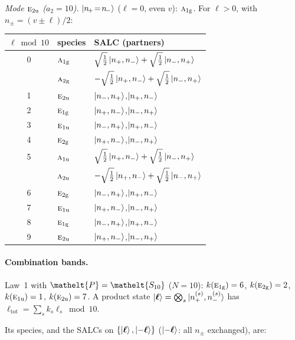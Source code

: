 \documentclass[11pt]{article}
\newcommand{\eltfont}[1]{{\let\sigma\eltsigma\mathelt{#1}}}
\newcommand{\irr}[1]{\text{\normalfont\scshape #1}}
\newcommand{\elt}[1]{\eltfont{#1}}
\newcommand{\ptag}[1]{\mathrm{#1}}
\newcommand{\pel}{\elt{P}}             %
\begin{document}
\emph{Mode $\irr{e}_{2\ptag{u}}$ ($a_2=10$).} $\ket{n_{\!+}\!=\!n_{\!-}}$ ($\ell=0$, even $v$): $\irr{a}_{1\ptag{g}}$. For $\ell>0$, with $n_\pm=(v\pm\ell)/2$:
\begin{longtable}{c l l}\hline $\ell\bmod 10$ & species & SALC (partners)\\ \hline\endhead
0 & $\irr{a}_{1\ptag{g}}$ & $\sqrt{\tfrac{1}{2}}\ket{n_+,n_-}+\sqrt{\tfrac{1}{2}}\ket{n_-,n_+}$\\
 & $\irr{a}_{2\ptag{g}}$ & $-\sqrt{\tfrac{1}{2}}\ket{n_+,n_-}+\sqrt{\tfrac{1}{2}}\ket{n_-,n_+}$\\
1 & $\irr{e}_{2\ptag{u}}$ & $\ket{n_-,n_+}$,\quad $\ket{n_+,n_-}$\\
2 & $\irr{e}_{1\ptag{g}}$ & $\ket{n_+,n_-}$,\quad $\ket{n_-,n_+}$\\
3 & $\irr{e}_{1\ptag{u}}$ & $\ket{n_-,n_+}$,\quad $\ket{n_+,n_-}$\\
4 & $\irr{e}_{2\ptag{g}}$ & $\ket{n_+,n_-}$,\quad $\ket{n_-,n_+}$\\
5 & $\irr{a}_{1\ptag{u}}$ & $\sqrt{\tfrac{1}{2}}\ket{n_+,n_-}+\sqrt{\tfrac{1}{2}}\ket{n_-,n_+}$\\
 & $\irr{a}_{2\ptag{u}}$ & $-\sqrt{\tfrac{1}{2}}\ket{n_+,n_-}+\sqrt{\tfrac{1}{2}}\ket{n_-,n_+}$\\
6 & $\irr{e}_{2\ptag{g}}$ & $\ket{n_-,n_+}$,\quad $\ket{n_+,n_-}$\\
7 & $\irr{e}_{1\ptag{u}}$ & $\ket{n_+,n_-}$,\quad $\ket{n_-,n_+}$\\
8 & $\irr{e}_{1\ptag{g}}$ & $\ket{n_-,n_+}$,\quad $\ket{n_+,n_-}$\\
9 & $\irr{e}_{2\ptag{u}}$ & $\ket{n_+,n_-}$,\quad $\ket{n_-,n_+}$\\
\hline\end{longtable}

\paragraph{Combination bands.}

Law~1 with $\pel=\elt{S_{10}}$ ($N=10$): $k(\irr{e}_{1\ptag{g}})=6$, $k(\irr{e}_{2\ptag{g}})=2$, $k(\irr{e}_{1\ptag{u}})=1$, $k(\irr{e}_{2\ptag{u}})=7$. A product state $\ket{\boldsymbol\ell}=\bigotimes_s\ket{n_+^{(s)},n_-^{(s)}}$ has $\ell_{\mathrm{tot}}=\sum_sk_s\ell_s\bmod 10$.

Its species, and the SALCs on $\{\ket{\boldsymbol\ell},\ket{-\boldsymbol\ell}\}$ ($\ket{-\boldsymbol\ell}$: all $n_\pm$ exchanged), are:
\end{document}
